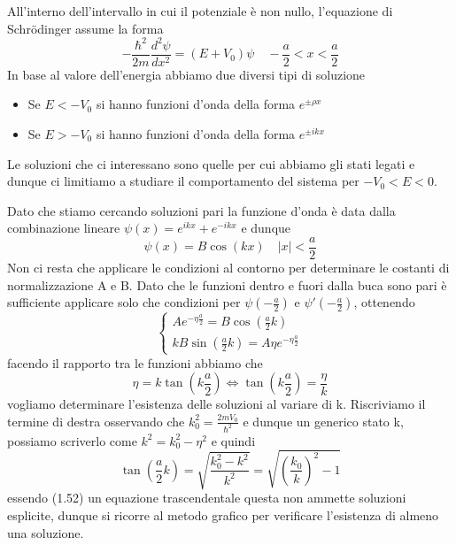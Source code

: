 \noindent All'interno dell'intervallo in cui il potenziale \`e non nullo, l'equazione di Schr\"odinger assume la forma
\begin{equation*}
	-\frac{\hbar^2}{2 m} \frac{d^2 \psi}{d x^2}=\left(E+V_0\right) \psi \quad -\frac{a}{2}<x< \frac{a}{2}
\end{equation*}
In base al valore dell'energia abbiamo due diversi tipi di soluzione 
\begin{itemize}
	\item Se $E < -V_0$ si hanno funzioni d'onda della forma $e^{\pm \rho x}$
	\item Se $E > -V_0$ si hanno funzioni d'onda della forma $e^{\pm ikx}$
\end{itemize}
Le soluzioni che ci interessano sono quelle per cui abbiamo gli stati legati e dunque ci limitiamo a studiare il comportamento del sistema per $-V_0 <E < 0$.

\noindent Dato che stiamo cercando soluzioni pari la funzione d'onda \`e data dalla combinazione lineare $\psi(x) = e^{ikx} + e^{-ikx}$ e dunque 
\begin{equation*}
	\psi(x) = B\cos(kx) \quad |x| < \frac{a}{2}
\end{equation*}
Non ci resta che applicare le condizioni al contorno per determinare le costanti di normalizzazione A e B. Dato che le funzioni dentro e fuori dalla buca sono pari \`e sufficiente applicare solo che condizioni per $\psi(-\frac{a}{2})$ e $\psi'(-\frac{a}{2})$, ottenendo
\begin{equation*}
\begin{cases}
	Ae^{-\eta \frac{a}{2}} = B \cos \left (\frac{a}{2}k \right ) \\
	kB \sin \left ( \frac{a}{2}k \right) = A\eta e^{-\eta \frac{a}{2}} 
\end{cases}
\end{equation*}
facendo il rapporto tra le funzioni abbiamo che 
\begin{equation*}
	\eta = k \tan \left (k \frac{a}{2} \right ) \iff \tan \left (k \frac{a}{2} \right ) = \frac{\eta}{k}
\end{equation*}
vogliamo determinare l'esistenza delle soluzioni al variare di k. Riscriviamo il termine di destra osservando che $k_0^2 = \frac{2mV_0}{\hbar^2}$ e dunque un generico stato k, possiamo scriverlo come $k^2 = k_0^2 - \eta^2$ e quindi
\begin{equation}
	\tan \left( \frac{a}{2}k \right ) = \sqrt{\frac{k_0^2 - k^2}{k^2}} = \sqrt{\left (\frac{k_0}{k} \right )^2 -1}
\end{equation}
essendo (1.52) un equazione trascendentale questa non ammette soluzioni esplicite, dunque si ricorre al metodo grafico per verificare l'esistenza di almeno una soluzione.

